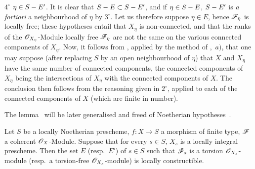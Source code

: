 $4^\circ$ $\eta\in S- E'$.
It is clear that $S- E\subset S- E'$, and if $\eta\in S- E$, $S- E'$ is \emph{a fortiori} a neighbourhood of $\eta$ by $3^\circ$.
Let us therefore suppose $\eta\in E$, hence $\mathscr{F}_\eta$ is locally free; these hypotheses entail that $X_\eta$ is non-connected, and that the ranks of the $\mathscr{O}_{X_\eta}$-Module locally free $\mathscr{F}_\eta$ are not the same on the various connected components of $X_\eta$.
Now, it follows from , applied by the method of ,~$a)$, that one may suppose (after replacing $S$ by an open neighbourhood of $\eta$) that $X$ and $X_\eta$ have the same number of connected components, the connected components of $X_\eta$ being the intersections of $X_\eta$ with the connected components of $X$.
The conclusion then follows from the reasoning given in $2^\circ$, applied to each of the connected components of $X$ (which are finite in number).

\begin{remark}[9.4.7.2]
\label{IV.9.4.7.2}
The lemma~ will be later generalised and freed of Noetherian hypotheses~.
\end{remark}

\begin{proposition}[9.4.8]
\label{IV.9.4.8}
Let $S$ be a locally Noetherian prescheme, $f:X\to S$ a morphism of finite type, $\mathscr{F}$ a coherent $\mathscr{O}_X$-Module.
Suppose that for every $s\in S$, $X_s$ is a locally integral prescheme.
Then the set $E$ \textnormal{(resp.}\ $E'$\textnormal{)} of $s\in S$ such that $\mathscr{F}_s$ is a torsion $\mathscr{O}_{X_s}$-module \textnormal{(resp.}\ a torsion-free $\mathscr{O}_{X_s}$-module\textnormal{)} is locally constructible.
\end{proposition}

